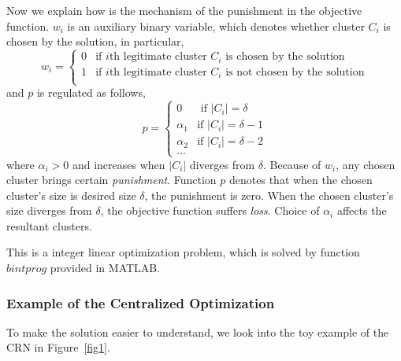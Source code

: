 \documentclass[journal,comsoc]{IEEEtran}
\theoremstyle{mytheoremstyle}
\theoremstyle{mytheoremstyle}
\theoremstyle{mytheoremstyle}
\begin{document}
Now we explain how is the mechanism of the punishment in the objective function. 
$w_i$ is an auxiliary binary variable, which denotes whether cluster $C_i$ is chosen by the solution, in particular, 
$$
w_i = \left\{ \begin{array}{rl}
0 &\mbox{if $i$th legitimate cluster $C_i$ is chosen by the solution} \\
1 &\mbox{if $i$th legitimate cluster $C_i$ is not chosen by the solution} \\
\end{array} \right.
$$
and $p$ is regulated as follows,
$$
p = \left\{ \begin{array}{rl}
0 &\mbox{ if $|C_i|=\delta$} \\
\alpha_1 &\mbox{if $|C_i|=\delta-1$} \\
\alpha_2 &\mbox{if $|C_i|=\delta-2$} \\
\dots
\end{array} \right.
$$
where $\alpha_i>0$ and increases when $|C_i|$ diverges from $\delta$.
Because of $w_i$, any chosen cluster brings certain \textit{punishment}.
Function $p$ denotes that when the chosen cluster's size is desired size $\delta$, the punishment is zero.
When the chosen cluster's size diverges from $\delta$, the objective function suffers \textit{loss}.
%
Choice of $\alpha_i$ affects the resultant clusters.







This is a integer linear optimization problem, which is solved by function $bintprog$ provided in MATLAB.

\subsubsection{Example of the Centralized Optimization}
To make the solution easier to understand, we look into the toy example of the CRN in Figure~\ref{fig1}.
\end{document}
